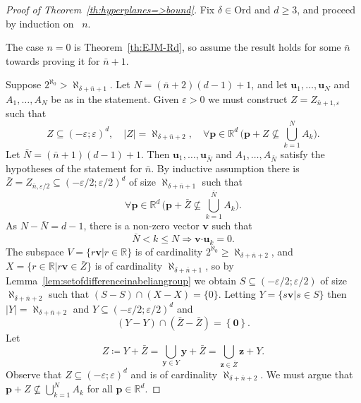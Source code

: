 \documentclass[10pt,a4paper]{amsart}
\newcommand{\FORALL}[1]{\forall {#1} \, }
\newcommand{\IMPLIES}{\Rightarrow }
\newcommand{\Mid}{\boldsymbol\mid}			%
\newcommand{\On}{\mathord{\mathrm{Ord}}}		%
\newcommand{\R}{\mathbb{R}}	%
\newcommand{\card}[1]{\mathopen | #1 \mathclose |}		%
\newcommand{\set}[1]{\mathopen \{ {#1} \mathclose \}} %
\newcommand{\setLR}[1]{\left \{ {#1} \right \}} %
\newcommand{\setof}[2]{\mathopen \{{#1}\Mid{#2} \mathclose\}} %
\begin{document}
\begin{proof}[Proof of Theorem~\ref{th:hyperplanes=>bound}]
Fix \( \delta \in \On \) and \( d \geq 3 \), and proceed by induction on  \( n \).

The case \( n = 0 \) is Theorem~\ref{th:EJM-Rd}, so assume the result holds for some \( \bar{n} \) towards proving it for \( \bar{n} + 1 \).

Suppose \( 2^{\aleph_0} > \aleph_{ \delta + \bar{n} + 1 } \).
Let \( N = ( \bar{n} + 2 ) ( d - 1 ) + 1 \), and let \( \mathbf{u}_1 , \dots , \mathbf{u}_ N \) and \( A_1 , \dots , A_ N \) be as in the statement.
Given \( \varepsilon > 0 \) we must construct \( Z = Z_{ \bar{n} + 1 , \varepsilon } \) such that 
\[ 
Z \subseteq ( - \varepsilon ; \varepsilon )^d , \quad \card{Z} = \aleph_{ \delta + \bar{n} + 2 } , \quad \FORALL{ \mathbf{p} \in \R^d } \bigl ( \mathbf{p} + Z \nsubseteq \textstyle \bigcup_{k = 1 }^N A_k \bigr ) .
\] 
Let \( \bar{N} = ( \bar{n} + 1 ) ( d - 1 ) + 1 \).
Then \( \mathbf{u}_1 , \dots , \mathbf{u}_{\bar{N} } \) and \( A_1 , \dots , A_{ \bar{N} } \) satisfy the hypotheses of the statement for \( \bar{n} \).
By inductive assumption there is \( \bar{Z} = Z_{ \bar{n} , \varepsilon / 2 } \subseteq ( - \varepsilon / 2 ; \varepsilon / 2 )^d \) of size \( \aleph_{ \delta + \bar{n} + 1 } \) such that 
\begin{equation}\label{eq:th:hyperplanes=>bound-1}
 \FORALL{ \mathbf{p} \in \R^d } \bigl ( \mathbf{p} + \bar{Z} \nsubseteq \textstyle \bigcup_{ k = 1 }^{\bar{N}} A_k \bigr ) .
\end{equation}
As \( N - \bar{N} = d - 1 \), there is a non-zero vector \( \mathbf{v} \) such that 
\begin{equation}\label{th:hyperplanes=>bound-2}
 \bar{N} < k \leq N \IMPLIES \mathbf{v} \boldsymbol{\cdot} \mathbf{u}_k = 0 . 
\end{equation}
The subspace \( V = \setof{ r \mathbf{v}}{ r \in \R } \) is of cardinality \( 2^{\aleph_0 } \geq \aleph_{ \delta + \bar{n} + 2 } \), and \( X = \setof{ r \in \R }{ r \mathbf{v} \in \bar{Z}} \) is of cardinality \( \aleph_{ \delta + \bar{n} + 1 } \), so by Lemma~\ref{lem:setofdifferenceinabeliangroup} we obtain \( S \subseteq ( - \varepsilon / 2 ; \varepsilon / 2 ) \) of size \( \aleph_{ \delta + \bar{n} + 2 } \) such that \( ( S - S ) \cap ( X - X ) = \set{0} \).
Letting \( Y = \setof{ s \mathbf{v} }{ s \in S } \) then \( \card{Y} = \aleph_{ \delta + \bar{n} + 2 } \) and \( Y \subseteq ( - \varepsilon / 2 ; \varepsilon / 2 )^d \) and 
\[
 ( Y - Y ) \cap ( \bar{Z} - \bar{Z} ) = \setLR{\mathbf{0}} .
\]
Let 
\[
 Z \coloneqq Y + \bar{Z}= \textstyle \bigcup_{ \mathbf{y} \in Y} \mathbf{y} + \bar{Z} = \bigcup_{ \mathbf{z} \in \bar{Z} } \mathbf{z} + Y .
\]
Observe that \( Z \subseteq ( - \varepsilon ; \varepsilon )^d \) and is of cardinality \( \aleph_{ \delta + \bar{n} + 2 } \).
We must argue that \( \mathbf{p} + Z \nsubseteq \bigcup_{ k = 1 }^ N A_k \) for all \( \mathbf{p} \in \R^d \).


\end{proof}
\end{document}
